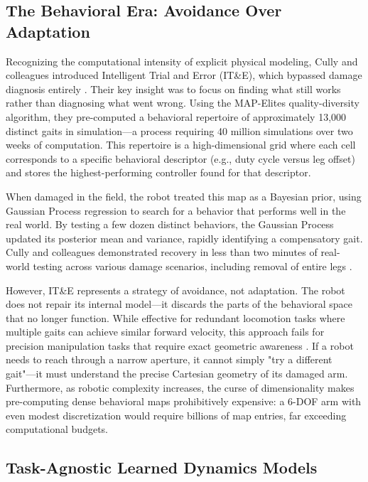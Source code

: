 ﻿\documentclass[12pt,a4paper,oneside]{report}
\begin{document}
\subsection{The Behavioral Era: Avoidance Over Adaptation}

Recognizing the computational intensity of explicit physical modeling, Cully and colleagues introduced Intelligent Trial and Error (IT\&E), which bypassed damage diagnosis entirely \cite{cully2015robots}. Their key insight was to focus on finding what still works rather than diagnosing what went wrong. Using the MAP-Elites quality-diversity algorithm, they pre-computed a behavioral repertoire of approximately 13,000 distinct gaits in simulation---a process requiring 40 million simulations over two weeks of computation. This repertoire is a high-dimensional grid where each cell corresponds to a specific behavioral descriptor (e.g., duty cycle versus leg offset) and stores the highest-performing controller found for that descriptor.

When damaged in the field, the robot treated this map as a Bayesian prior, using Gaussian Process regression to search for a behavior that performs well in the real world. By testing a few dozen distinct behaviors, the Gaussian Process updated its posterior mean and variance, rapidly identifying a compensatory gait. Cully and colleagues demonstrated recovery in less than two minutes of real-world testing across various damage scenarios, including removal of entire legs \cite{cully2015robots}.

However, IT\&E represents a strategy of avoidance, not adaptation. The robot does not repair its internal model---it discards the parts of the behavioral space that no longer function. While effective for redundant locomotion tasks where multiple gaits can achieve similar forward velocity, this approach fails for precision manipulation tasks that require exact geometric awareness \cite{kwiatkowski2019task}. If a robot needs to reach through a narrow aperture, it cannot simply "try a different gait"---it must understand the precise Cartesian geometry of its damaged arm. Furthermore, as robotic complexity increases, the curse of dimensionality makes pre-computing dense behavioral maps prohibitively expensive: a 6-DOF arm with even modest discretization would require billions of map entries, far exceeding computational budgets.

\subsection{Task-Agnostic Learned Dynamics Models}
\end{document}
